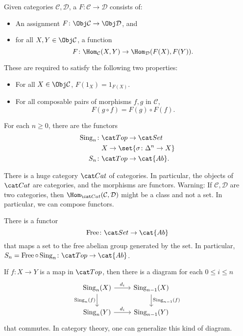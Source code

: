 \documentclass{standalone}
\begin{document}
\begin{definition}
  Given categories \(\mathcal C, \mathcal D\), a 
  \(F \colon \mathcal C \to \mathcal D\) consists of:
  \begin{itemize}[nosep]
    \item An assignment \(F \colon \Obj \mathcal C \to \Obj \mathcal D\), and
    \item for all \(X, Y \in \Obj \mathcal C\), a function
      \[
        F \colon \Hom_{\mathcal C}(X, Y) \to \Hom_{\mathcal D}(F(X), F(Y)).
      \]
  \end{itemize}
  These are required to satisfy the following two properties:
  \begin{itemize}[nosep]
    \item For all \(X \in \Obj \mathcal C\), \(F(1_X) = 1_{F(X)}\).
    \item For all composable pairs of morphisms \(f, g\) in \(\mathcal C\),
    \[
      F(g \circ f) = F(g) \circ F(f).
    \]
  \end{itemize}
\end{definition}

\begin{example}
  For each \(n \geq 0\), there are the functors
  \begin{align*}
    \Sing_n \colon& \cTop \to \cSet \\
      & X \to \set{\sigma \colon \Delta^n \to X} \\
    S_n \colon& \cTop \to \cat{Ab}.
  \end{align*}
\end{example}

There is a huge category \(\cCat\) of categories. In particular,
the objects of \(\cCat\) are categories, and the morphisms are functors.
Warning: If \(\mathcal C, \mathcal D\) are two categories, then
\(\Hom_{\cCat}(\mathcal C, \mathcal D)\) might be a class and not a set.
In particular, we can compose functors.

\begin{example}
  There is a functor
  \[
    \operatorname{Free} \colon \cSet \to \cat{Ab}
  \]
  that maps a set to the free abelian group generated by the set.
  In particular,
  \(S_n = \operatorname{Free} \circ \Sing_n \colon \cTop \to \cat{Ab}\).
\end{example}

If \(f \colon X \to Y\) is a map in \(\cTop\), then there is a diagram
for each \(0 \leq i \leq n\)
\[
  \begin{tikzcd}
    \Sing_n(X)\arrow[r, "d_i"]\arrow[d, "\Sing_n(f)", swap] &
      \Sing_{n-1}(X)\arrow[d, "\Sing_{n-1}(f)"] \\
    \Sing_n(Y)\arrow[r, "d_i"] & \Sing_{n-1}(Y)
  \end{tikzcd}
\]
that commutes. In category theory, one can generalize this kind of diagram.
\end{document}
